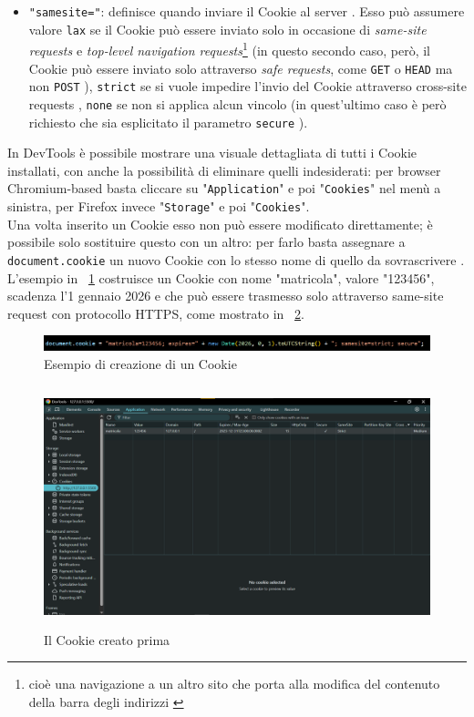 \documentclass[a4paper, 12pt, twoside, openright]{book}
\begin{document}
\begin{itemize}
\item\texttt{"samesite="}: definisce quando inviare il Cookie al server \cite{MDN_Web_docs:cookies}. Esso può assumere valore \texttt{lax} se il Cookie può essere inviato solo in occasione di \textit{same-site requests} e \textit{top-level navigation requests}\footnote{cioè una navigazione a un altro sito che porta alla modifica del contenuto della barra degli indirizzi \cite{Stack_overflow:samesite}} \cite{MDN_Web_docs:cookies} (in questo secondo caso, però, il Cookie può essere inviato solo attraverso \textit{safe requests}, come \texttt{GET} o \texttt{HEAD} ma non \texttt{POST} \cite{Stack_overflow:samesite}), \texttt{strict} se si vuole impedire l'invio del Cookie attraverso cross-site requests \cite{MDN_Web_docs:cookies}, \texttt{none} se non si applica alcun vincolo \cite{MDN_Web_docs:cookies} (in quest'ultimo caso è però richiesto che sia esplicitato il parametro \texttt{secure} \cite{MDN_Web_docs:HTTP_cookies}).
\end{itemize}
In DevTools è possibile mostrare una visuale dettagliata di tutti i Cookie installati, con anche la possibilità di eliminare quelli indesiderati: per browser Chromium-based basta cliccare su "\texttt{Application}" e poi "\texttt{Cookies}" nel menù a sinistra, per Firefox invece "\texttt{Storage}" e poi "\texttt{Cookies}".\\
Una volta inserito un Cookie esso non può essere modificato direttamente; è possibile solo sostituire questo con un altro: per farlo basta assegnare a \texttt{document.cookie} un nuovo Cookie con lo stesso nome di quello da sovrascrivere \cite{W3Schools:cookies}.\\
L'esempio in \figurename~\ref{example_cookie:code_snippet} costruisce un Cookie con nome "matricola", valore "123456", scadenza l'1 gennaio 2026 e che può essere trasmesso solo attraverso same-site request con protocollo HTTPS, come mostrato in \figurename~\ref{example_cookie}.\\
\begin{figure}[ht]
  \centering
  \includegraphics[width=15cm]{images/cookies/code_snippet.png}
  \caption{Esempio di creazione di un Cookie}
  \label{example_cookie:code_snippet}
\end{figure}
\begin{figure}[ht]
  \centering
  \includegraphics[height=7cm]{images/cookies/demonstration.png}
  \caption{Il Cookie creato prima}
  \label{example_cookie}
\end{figure}
\end{document}

